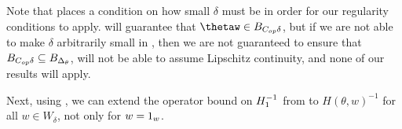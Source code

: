 %
Note that  places a condition on how
small $\delta$ must be in order for our regularity conditions to
apply.  will guarantee that $\thetaw\in\thetadeltaball$,
but if we are not able to make $\delta$ arbitrarily small in ,
then we are not guaranteed to ensure that $B_{C_{op}\delta}\subseteq B_{\Delta_{\theta}}$,
will not be able to assume Lipschitz continuity, and none of our results
will apply.

Next, using , we can extend the operator
bound on $H_{1}^{-1}$ from  to $H\left(\theta,w\right)^{-1}$
for all $w\in W_{\delta}$, not only for $w=1_{w}$.

